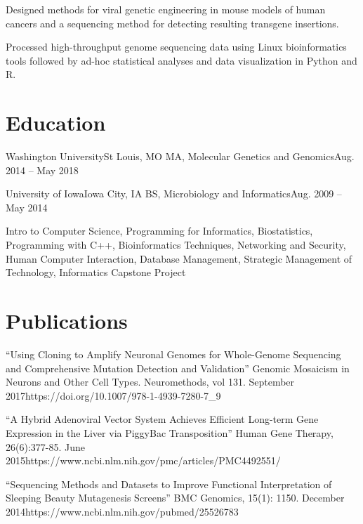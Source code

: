 \resumeItemListStart

{Designed methods for viral genetic engineering in mouse models of human cancers and a sequencing method for detecting resulting transgene insertions.}

{Processed high-throughput genome sequencing data using Linux bioinformatics tools followed by ad-hoc statistical analyses and data visualization in Python and R.}

\resumeItemListEnd

\resumeSubHeadingListEnd

\section{Education}
\resumeSubHeadingListStart

\resumeSubheading
{Washington University}{St Louis, MO}
{MA, Molecular Genetics and Genomics}{Aug. 2014 -- May 2018}

\resumeSubheading
{University of Iowa}{Iowa City, IA}
{BS, Microbiology and Informatics}{Aug. 2009 -- May 2014}

\resumeItemListStart

{Intro to Computer Science, Programming for Informatics, Biostatistics, Programming with C++, Bioinformatics Techniques, Networking and Security, Human Computer Interaction, Database Management, Strategic Management of Technology, Informatics Capstone Project}

\resumeItemListEnd

\resumeSubHeadingListEnd

\section{Publications}
\resumeSubHeadingListStart

{ ``Using Cloning to Amplify Neuronal Genomes for Whole-Genome Sequencing and Comprehensive Mutation Detection and Validation'' Genomic Mosaicism in Neurons and Other Cell Types. Neuromethods, vol 131. September 2017}{https://doi.org/10.1007/978-1-4939-7280-7\_9}

{ ``A Hybrid Adenoviral Vector System Achieves Efficient Long-term Gene Expression in the Liver via PiggyBac Transposition'' Human Gene Therapy, 26(6):377-85. June 2015}{https://www.ncbi.nlm.nih.gov/pmc/articles/PMC4492551/}

{ ``Sequencing Methods and Datasets to Improve Functional Interpretation of Sleeping Beauty Mutagenesis Screens'' BMC Genomics, 15(1): 1150. December 2014}{https://www.ncbi.nlm.nih.gov/pubmed/25526783}

\resumeSubHeadingListEnd


